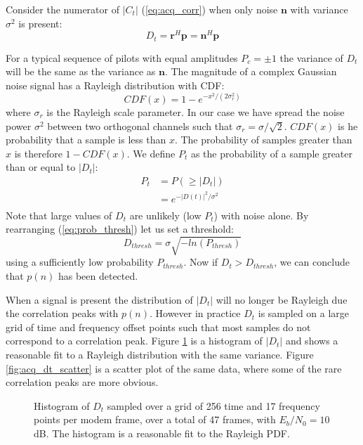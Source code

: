 \documentclass{article}
\begin{document}
Consider the numerator of $|C_t|$ (\ref{eq:acq_corr}) when only noise $\bm{n}$ with variance $\sigma^2$ is present:
\begin{equation}
D_t = \bm{r}^H\bm{p} = \bm{n}^H\bm{p}
\end{equation}

For a typical sequence of pilots with equal amplitudes $P_c=\pm1$ the variance of $D_t$ will be the same as the variance as $\bm{n}$.  The magnitude of a complex Gaussian noise signal has a Rayleigh distribution \cite{rayleigh} with CDF:
\begin{equation}
CDF(x) = 1 - e^{-x^2/(2 \sigma_r^2)}
\end{equation}
where $\sigma_r$ is the Rayleigh scale parameter.  In our case we have spread the noise power $\sigma^2$ between two orthogonal channels such that $\sigma_r = \sigma/\sqrt{2}$. $CDF(x)$ is he probability that a sample is less than $x$.  The probability of samples greater than $x$ is therefore $1-CDF(x)$.  We define $P_t$ as the probability of a sample greater than or equal to $|D_t|$: 
\begin{equation}
\label{eq:prob_thresh}
\begin{split}
P_t &= P(\ge|D_t|) \\
    &= e^{-|D(t)|^2/\sigma^2} \\
\end{split}
\end{equation}
Note that large values of $D_t$ are unlikely (low $P_t$) with noise alone. By rearranging (\ref{eq:prob_thresh}) let us set a threshold:
\begin{equation}
\label{eq:corr_prob}
D_{thresh} = \sigma\sqrt{-ln(P_{thresh})}
\end{equation}
using a sufficiently low probability $P_{thresh}$. Now if $D_t > D_{thresh}$, we can conclude that $p(n)$ has been detected.  

When a signal is present the distribution of $|D_t|$ will no longer be Rayleigh due the correlation peaks with $p(n)$. However in practice $D_t$ is sampled on a large grid of time and frequency offset points such that most samples do not correspond to a correlation peak.  Figure \ref{fig:acq_dt_hist} is a histogram of $|D_t|$ and shows a reasonable fit to a Rayleigh distribution with the same variance.  Figure \ref{fig:acq_dt_scatter} is a scatter plot of the same data, where some of the rare correlation peaks are more obvious.

\begin{figure}[H]
\caption{Histogram of $D_t$ sampled over a grid of 256 time and 17 frequency points per modem frame, over a total of 47 frames, with $E_b/N_0=10$ dB. The histogram is a reasonable fit to the Rayleigh PDF.}
\label{fig:acq_dt_hist}
\begin{center}

\end{center}
\end{figure}
\end{document}
